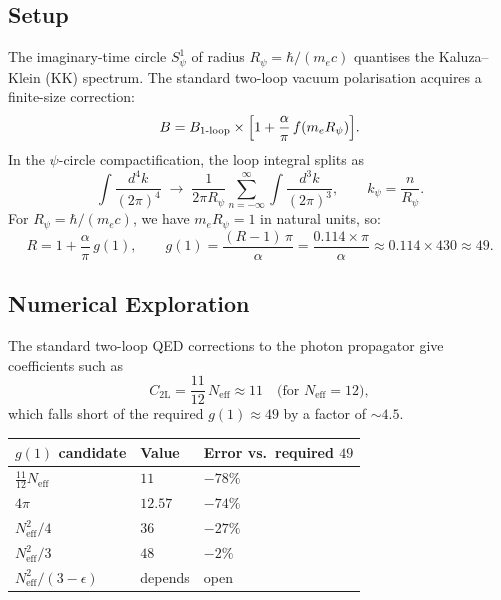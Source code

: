 \documentclass[11pt,a4paper]{article}
\theoremstyle{remark}
\begin{document}
\subsection{Setup}

The imaginary-time circle $S^1_\psi$ of radius $R_\psi = \hbar/(m_e c)$
quantises the Kaluza--Klein (KK) spectrum.  The standard two-loop vacuum
polarisation acquires a finite-size correction:
\begin{equation}
  B = B_{1\text{-loop}} \times \Bigl[1 + \frac{\alpha}{\pi}\,f(m_e R_\psi)\Bigr].
\end{equation}
In the $\psi$-circle compactification, the loop integral splits as
\begin{equation}
  \int\!\frac{d^4 k}{(2\pi)^4} \;\longrightarrow\;
  \frac{1}{2\pi R_\psi}\sum_{n=-\infty}^{\infty}\int\!\frac{d^3 k}{(2\pi)^3},
  \qquad k_\psi = \frac{n}{R_\psi}.
\end{equation}
For $R_\psi = \hbar/(m_e c)$, we have $m_e R_\psi = 1$ in natural units, so:
\begin{equation}
  R = 1 + \frac{\alpha}{\pi}\,g(1),
  \qquad
  g(1) = \frac{(R-1)\,\pi}{\alpha}
        = \frac{0.114 \times \pi}{\alpha}
        \approx 0.114 \times 430 \approx 49.
  \label{eq:F1_g1_required}
\end{equation}

\subsection{Numerical Exploration}

The standard two-loop QED corrections to the photon propagator give
coefficients such as
\begin{equation}
  C_{2\text{L}} = \frac{11}{12}\,N_{\mathrm{eff}} \approx 11 \quad
  \text{(for } N_{\mathrm{eff}} = 12\text{)},
\end{equation}
which falls short of the required $g(1) \approx 49$ by a factor of $\sim 4.5$.

\begin{center}
\begin{tabular}{lll}
  \toprule
  $g(1)$ candidate & Value & Error vs.\ required $49$ \\
  \midrule
  $\frac{11}{12} N_{\mathrm{eff}}$          & $11$      & $-78\%$ \\
  $4\pi$                                     & $12.57$   & $-74\%$ \\
  $N_{\mathrm{eff}}^2/4$                    & $36$      & $-27\%$ \\
  $N_{\mathrm{eff}}^2/3$                    & $48$      & $-2\%$  \\
  $N_{\mathrm{eff}}^2/(3 - \epsilon)$       & depends   & open    \\
  \bottomrule
\end{tabular}
\end{center}
\end{document}
